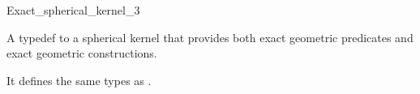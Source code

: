\begin{ccRefClass}{Exact_spherical_kernel_3}


\ccDefinition

A typedef to a spherical kernel that provides
both exact geometric predicates and exact geometric constructions.

\medskip

It defines the same types as .

\ccIsModel


\ccSeeAlso


\end{ccRefClass}
